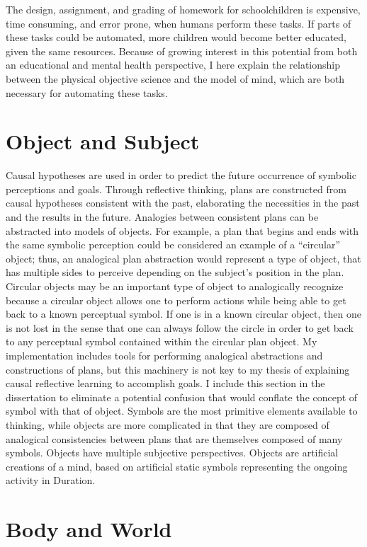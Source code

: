 The design, assignment, and grading of homework for schoolchildren is
expensive, time consuming, and error prone, when humans perform these
tasks.  If parts of these tasks could be automated, more children
would become better educated, given the same resources.  Because of
growing interest in this potential from both an educational and mental
health perspective, I here explain the relationship between the
physical objective science and the model of mind, which are both
necessary for automating these tasks.

\section{Object and Subject}

Causal hypotheses are used in order to predict the future occurrence
of symbolic perceptions and goals.  Through reflective thinking, plans
are constructed from causal hypotheses consistent with the past,
elaborating the necessities in the past and the results in the future.
Analogies between consistent plans can be abstracted into models of
objects.  For example, a plan that begins and ends with the same
symbolic perception could be considered an example of a ``circular''
object; thus, an analogical plan abstraction would represent a type of
object, that has multiple sides to perceive depending on the subject's
position in the plan.  Circular objects may be an important type of
object to analogically recognize because a circular object allows one
to perform actions while being able to get back to a known perceptual
symbol.  If one is in a known circular object, then one is not lost in
the sense that one can always follow the circle in order to get back
to any perceptual symbol contained within the circular plan object.
My implementation includes tools for performing analogical
abstractions and constructions of plans, but this machinery is not key
to my thesis of explaining causal reflective learning to accomplish
goals.  I include this section in the dissertation to eliminate a
potential confusion that would conflate the concept of symbol with
that of object.  Symbols are the most primitive elements available to
thinking, while objects are more complicated in that they are composed
of analogical consistencies between plans that are themselves composed
of many symbols.  Objects have multiple subjective perspectives.
Objects are artificial creations of a mind, based on artificial static
symbols representing the ongoing activity in Duration.

\section{Body and World}

